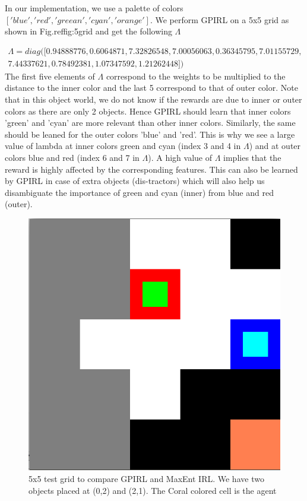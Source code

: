 \documentclass{article}[11pt]
\begin{document}
 In our implementation, we use a palette of colors $['blue', 'red', 'greean', 'cyan', 'orange']$. We perform GPIRL on a 5x5 grid as shown in Fig.ref{fig:5grid} and get the following $\Lambda$
 
\begin{align*}
\Lambda = diag([ 0.94888776,  0.6064871,   7.32826548,  7.00056063 , 0.36345795 , 7.01155729,\\
7.44337621 , 0.78492381 , 1.07347592 , 1.21262448])
\end{align*} The first five elements of $\Lambda$ correspond to the weights to be multiplied to the distance to the inner color and the last 5 correspond to that of outer color. Note that in this object world, we do not know if the rewards are due to inner or outer colors as there are only 2 objects. Hence GPIRL should learn that inner colors 'green' and 'cyan' are more relevant than other inner colors. Similarly, the same should be leaned for the outer colors 'blue' and 'red'. This is why we see a large value of lambda at inner colors green and cyan (index 3 and 4 in $\Lambda$) and at outer colors blue and red (index 6 and 7 in $\Lambda$). A high value of $\Lambda$ implies that the reward is highly affected by the corresponding features. This can also be learned by GPIRL in case of extra objects (dis-tractors) which will also help us disambiguate the importance of green and cyan (inner) from blue and red (outer). 



 \begin{figure}[H]
  \begin{center}
    \includegraphics[width=0.8\linewidth]{images/5grid}
    \caption{5x5 test grid to compare GPIRL and MaxEnt IRL. We have two objects placed at (0,2) and (2,1). The Coral colored cell is the agent}
    \label{fig:5grid}
  \end{center}
\end{figure}
\end{document}
